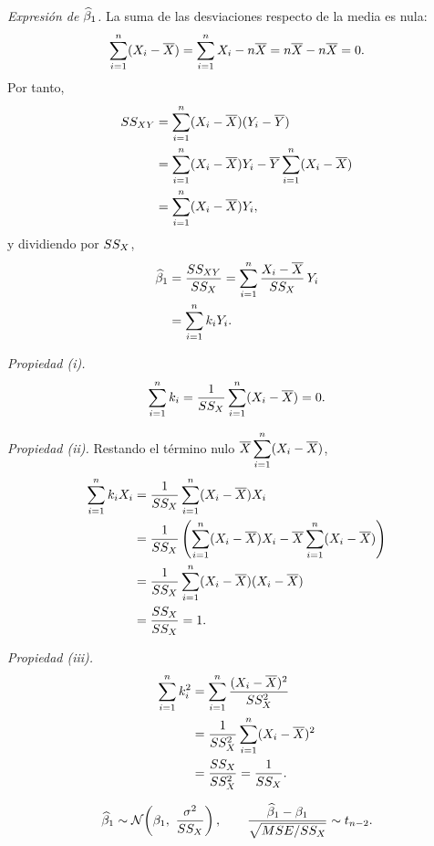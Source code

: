 \begin{demostracion}
  \emph{Expresión de $\widehat{\beta}_1$.} La suma de las desviaciones respecto de la media es nula:
  \[
    \sum_{i=1}^{n} (X_i-\overline{X}) = \sum_{i=1}^{n} X_i - n\overline{X} = n\overline{X}-n\overline{X} = 0 .
  \]
  Por tanto,
  \begin{align*}
    SS_{XY} &= \sum_{i=1}^{n} (X_i-\overline{X})(Y_i-\overline{Y}) \\
            &= \sum_{i=1}^{n} (X_i-\overline{X})Y_i - \overline{Y}\sum_{i=1}^{n} (X_i-\overline{X}) \\
            &= \sum_{i=1}^{n} (X_i-\overline{X})Y_i ,
  \end{align*}
  y dividiendo por $SS_X$,
  \begin{align*}
    \widehat{\beta}_1 &= \frac{SS_{XY}}{SS_X}
      = \sum_{i=1}^{n} \frac{X_i-\overline{X}}{SS_X}\,Y_i \\
    &= \sum_{i=1}^{n} k_iY_i .
  \end{align*}

  \emph{Propiedad (i).}
  \[
    \sum_{i=1}^{n} k_i = \frac{1}{SS_X}\sum_{i=1}^{n} (X_i-\overline{X}) = 0 .
  \]

  \emph{Propiedad (ii).} Restando el término nulo $\overline{X}\displaystyle\sum_{i=1}^{n} (X_i-\overline{X})$,
  \begin{align*}
    \sum_{i=1}^{n} k_iX_i &= \frac{1}{SS_X}\sum_{i=1}^{n} (X_i-\overline{X})X_i \\
    &= \frac{1}{SS_X}\left(\sum_{i=1}^{n} (X_i-\overline{X})X_i - \overline{X}\sum_{i=1}^{n} (X_i-\overline{X})\right) \\
    &= \frac{1}{SS_X}\sum_{i=1}^{n} (X_i-\overline{X})(X_i-\overline{X}) \\
    &= \frac{SS_X}{SS_X} = 1 .
  \end{align*}

  \emph{Propiedad (iii).}
  \begin{align*}
    \sum_{i=1}^{n} k_i^2 &= \sum_{i=1}^{n} \frac{(X_i-\overline{X})^2}{SS_X^2} \\
    &= \frac{1}{SS_X^2}\sum_{i=1}^{n} (X_i-\overline{X})^2 \\
    &= \frac{SS_X}{SS_X^2} = \frac{1}{SS_X} .
  \end{align*}
\end{demostracion}

\begin{teorema}
  \[
    \widehat{\beta}_1 \sim \mathcal{N}\!\left(\beta_1,\ \frac{\sigma^2}{SS_X}\right),
    \qquad
    \frac{\widehat{\beta}_1-\beta_1}{\sqrt{MSE/SS_X}} \sim t_{n-2} .
  \]
\end{teorema}

